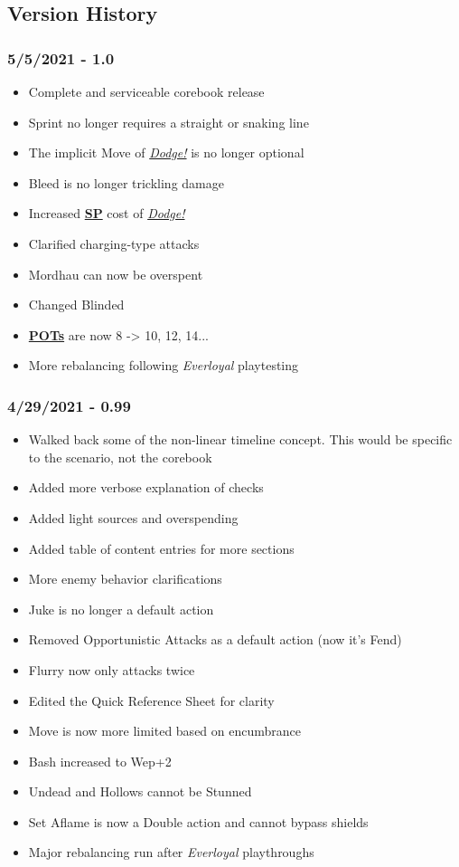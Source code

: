 \documentclass[12pt]{article}
\newcommand{\refto}[1]{\hyperlink{#1}{\textbf{#1}}}
\newcommand{\reftoit}[1]{\hyperlink{#1}{\emph{#1}}}
\begin{document}
\begin{multicols*}{2}
\vfill

\pagebreak

\section{Version History}
\subsubsection*{5/5/2021 - 1.0}
\begin{itemize}
\item Complete and serviceable corebook release
\item Sprint no longer requires a straight or snaking line
\item The implicit Move of \reftoit{Dodge!} is no longer optional
\item Bleed is no longer trickling damage
\item Increased \refto{SP} cost of \reftoit{Dodge!}
\item Clarified charging-type attacks
\item Mordhau can now be overspent
\item Changed Blinded
\item \refto{POTs} are now 8 -> 10, 12, 14...
\item More rebalancing following \emph{Everloyal} playtesting
\end{itemize}
\subsubsection*{4/29/2021 - 0.99}
\begin{itemize}
\item Walked back some of the non-linear timeline concept. This would be specific to the scenario, not the corebook
\item Added more verbose explanation of checks
\item Added light sources and overspending
\item Added table of content entries for more sections
\item More enemy behavior clarifications
\item Juke is no longer a default action
\item Removed Opportunistic Attacks as a default action (now it’s Fend)
\item Flurry now only attacks twice
\item Edited the Quick Reference Sheet for clarity
\item Move is now more limited based on encumbrance
\item Bash increased to Wep+2
\item Undead and Hollows cannot be Stunned
\item Set Aflame is now a Double action and cannot bypass shields
\item Major rebalancing run after \emph{Everloyal} playthroughs
\end{itemize}

\end{multicols*}
\end{document}
